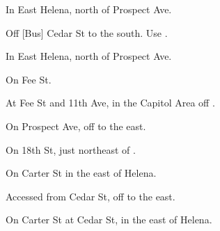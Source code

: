 

\begin{LocationList}

\Location{\GarageHQ \Garage}
In East Helena, north of  Prospect Ave.

Off [Bus] Cedar St to the south. Use  .

In East Helena, north of  Prospect Ave.

\Location{\RecruitmentAgency \Recruitment}
On Fee St.

At Fee St and 11th Ave, in the Capitol Area off  .

\Location{\TruckStop \Gas \Rest}
On  Prospect Ave, off   to the east.

On 18th St, just northeast of  .

On Carter St in the east of Helena.

Accessed from Cedar St, off   to the east.

On Carter St at Cedar St, in the east of Helena.

\end{LocationList}
